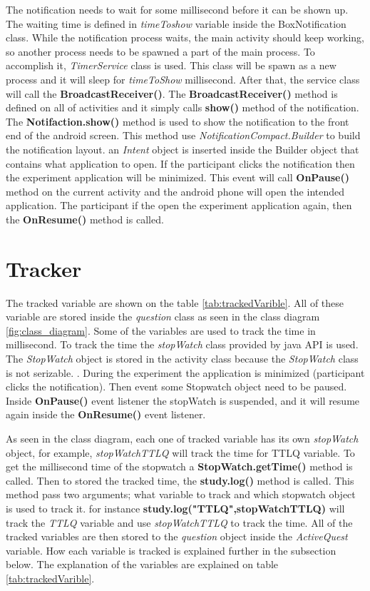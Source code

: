 The notification needs to wait for some millisecond before it can be shown up. The waiting time is defined in \textit{timeToshow} variable inside the BoxNotification class.
While the notification process waits, the main activity should keep working, so another process needs to be spawned a part of the main process.
To accomplish it, \textit{TimerService} class is used. This class will be spawn as a new process and it will sleep for \textit{timeToShow} millisecond.
After that, the service class will call the \textbf{BroadcastReceiver()}.
The \textbf{BroadcastReceiver()} method  is defined on all of activities and it simply calls \textbf{show()} method of the notification.
The \textbf{Notifaction.show()} method is used to show the notification to the front end of the android screen. This method use
 \textit{NotificationCompact.Builder} to build the notification layout.
 an \textit{Intent} object is inserted inside the Builder object that contains what application to open.
 If the participant clicks the notification then the experiment application will be minimized.
 This event will call \textbf{OnPause()} method on the current activity and the android phone will open the intended application.
 The participant if the open the experiment application again, then the \textbf{OnResume()} method is called.


\section{Tracker}

The tracked variable are shown on the table \ref{tab:trackedVarible}.
All of these variable are stored inside the \textit{question} class as seen in the class diagram \ref{fig:class_diagram}.
Some of the variables are used to track the time in millisecond.
To track the time the \textit{stopWatch} class provided by java API is used.
The \textit{StopWatch} object is stored in the activity class because the \textit{StopWatch} class is not serizable.
.
During the experiment the application is minimized (participant clicks the notification).
Then event some Stopwatch object need to be paused. Inside \textbf{OnPause()} event listener the stopWatch is suspended,
and it will resume again inside the \textbf{OnResume()} event listener.

As seen in the class diagram, each one of tracked variable has its own \textit{stopWatch} object, for example, \textit{stopWatchTTLQ} will track the time for TTLQ variable.
To get the millisecond time of the stopwatch a \textbf{StopWatch.getTime()} method is called.
Then to stored the tracked time, the \textbf{study.log()} method is called.
This method pass two arguments; what variable to track and which stopwatch object is used to track it.
for instance \textbf{study.log("TTLQ",stopWatchTTLQ)} will track the \textit{TTLQ} variable and use \textit{stopWatchTTLQ} to track the time.
All of the tracked variables are then stored to the \textit{question} object inside the \textit{ActiveQuest} variable.
How each variable is tracked is explained further in the subsection below.
The explanation of the variables are explained on table \ref{tab:trackedVarible}.

